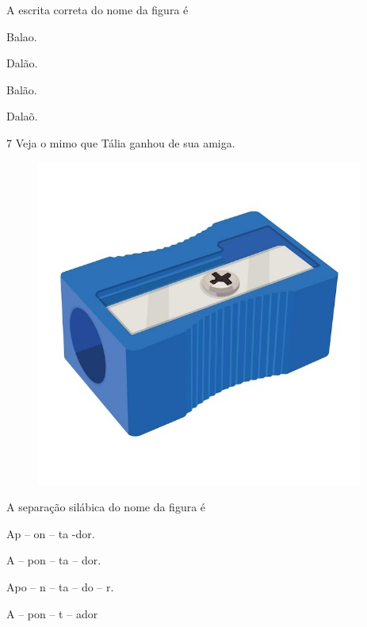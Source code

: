 
A escrita correta do nome da figura é

\begin{escolha}
\item Balao.

\item Dalão.

\item Balão.

\item Dalaõ.
\end{escolha}


\num{7} Veja o mimo que Tália ganhou de sua amiga.

\begin{figure}[htpb!]
\centering
\includegraphics[width=.5\textwidth]{media/image168.jpeg}
\end{figure}


A separação silábica do nome da figura é

\begin{escolha}
\item Ap -- on -- ta -dor.

\item A -- pon -- ta -- dor.

\item Apo -- n -- ta -- do -- r.

\item A -- pon -- t -- ador
\end{escolha}

